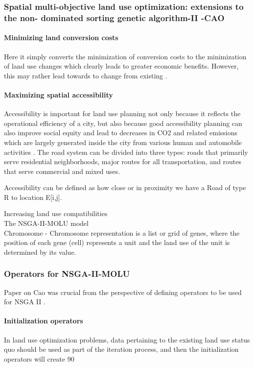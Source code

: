 \documentclass{sig-alternate}
\begin{document}
\subsubsection{Spatial multi-objective land use optimization: extensions to the  non- dominated sorting genetic algorithm-II -CAO}
\paragraph*{Minimizing land conversion costs}
Here it simply converts the minimization of conversion costs to the minimization of land use changes which clearly leads to greater economic benefits. However, this may rather lead towards to change from existing .

\paragraph*{Maximizing spatial accessibility}
Accessibility is important for land use planning not only because it reflects the operational efficiency of a city, but also because good accessibility planning can also improve social equity and lead to decreases in CO2 and related emissions which are largely generated inside the city from various human and automobile activities . The road system can be divided into three types:
roads that primarily serve residential neighborhoods, major routes for all transportation,
and routes that serve commercial and mixed uses.

Accessibility can be defined as how close or in proximity we have a Road of type R to location E[i,j].

Increasing land use compatibilities \\[.15cm]

The NSGA-II-MOLU model \\
Chromosome - Chromosome representation is a list or grid of genes, where the position of each
gene (cell) represents a unit and the land use of the unit is determined by its value.


\subsubsection*{Operators for NSGA-II-MOLU}
Paper on Cao was crucial from the perspective of defining operators to be used for NSGA II . \\
\paragraph*{Initialization operators}
In land use optimization problems, data pertaining to the existing land use status quo should be used as part of the iteration process, and then the initialization operators will create 90%
\end{document}
